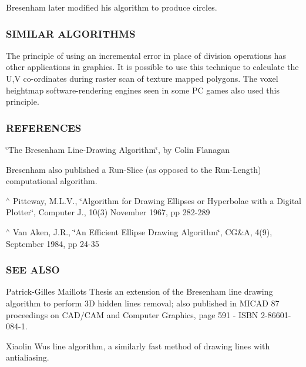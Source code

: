 Bresenham later modified his algorithm to produce circles.

\subsubsection*{S\+I\+M\+I\+L\+AR A\+L\+G\+O\+R\+I\+T\+H\+MS}

The principle of using an incremental error in place of division operations has other applications in graphics. It is possible to use this technique to calculate the U,V co-\/ordinates during raster scan of texture mapped polygons. The voxel heightmap software-\/rendering engines seen in some PC games also used this principle.

\subsubsection*{R\+E\+F\+E\+R\+E\+N\+C\+ES}


\begin{DoxyItemize}
\item \char`\"{}\+The Bresenham Line-\/\+Drawing Algorithm\char`\"{}, by Colin Flanagan
\end{DoxyItemize}

Bresenham also published a Run-\/\+Slice (as opposed to the Run-\/\+Length) computational algorithm.


\begin{DoxyEnumerate}
\item $^\wedge$ Pitteway, M.\+L.\+V., \char`\"{}\+Algorithm for Drawing Ellipses or Hyperbolae with a Digital Plotter\char`\"{}, Computer J., 10(3) November 1967, pp 282-\/289
\item $^\wedge$ Van Aken, J.\+R., \char`\"{}\+An Efficient Ellipse Drawing Algorithm\char`\"{}, CG\&A, 4(9), September 1984, pp 24-\/35
\end{DoxyEnumerate}

\subsubsection*{S\+EE A\+L\+SO}


\begin{DoxyItemize}
\item Patrick-\/\+Gilles Maillot\textquotesingle{}s Thesis an extension of the Bresenham line drawing algorithm to perform 3D hidden lines removal; also published in M\+I\+C\+AD \textquotesingle{}87 proceedings on C\+A\+D/\+C\+AM and Computer Graphics, page 591 -\/ I\+S\+BN 2-\/86601-\/084-\/1.
\item Xiaolin Wu\textquotesingle{}s line algorithm, a similarly fast method of drawing lines with antialiasing.
\end{DoxyItemize}

